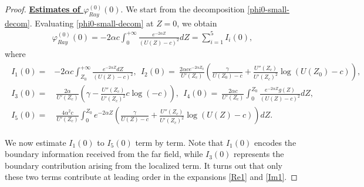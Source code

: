 \documentclass[reqno,11pt]{amsart}
\numberwithin{equation}{section}
\numberwithin{equation}{section}
\theoremstyle{plain}
\begin{document}
\begin{proof}
	\underline{\bf Estimates of $\varphi_{Ray}^{(0)}(0)$}. We start from the decomposition \eqref{phi0-small-decom}. Evaluating \eqref{phi0-small-decom} at $Z=0$, we obtain
	\begin{align}\label{phi0-0}
		\varphi_{Ray}^{(0)}(0)=-2\alpha c\int_{0}^{+\infty}\frac{e^{-2\alpha Z}}{(U(Z)-c)^2}dZ=\sum_{i=1}^{5}I_i(0),
	\end{align}
	where
	\begin{align}\begin{aligned}
			I_1(0)=&-2\alpha c\int_{Z_0}^{+\infty}\frac{e^{-2\alpha Z}dZ}{(U(Z)-c)^2},\ \  I_{2}(0) = ~\frac{2\alpha ce^{-2\alpha Z_0}}{U'(Z_c)}\left(\frac{\gamma}{U(Z_0)-c}+\frac{U''(Z_c)}{U'(Z_c)^2}\log(U(Z_0)-c)\right), \\
			I_{3}(0) =& ~\frac{2\alpha}{U'(Z_c)}\left(\gamma-\frac{U''(Z_c)}{U'(Z_c)^2}c\log(-c)\right), \ \
			I_{4}(0) =   ~\frac{2\alpha c}{U'(Z_c)}\int_{0}^{Z_0}\frac{e^{-2\alpha Z}g(Z)}{(U(Z)-c)^2}dZ,\\
			I_{5}(0) =&   ~\frac{4\alpha^2 c}{U'(Z_c)}\int_{0}^{Z_0}e^{-2\alpha Z}\left(\frac{\gamma}{U(Z)-c}+\frac{ U''(Z_c)}{U'(Z_c)^2}\log(U(Z)-c)\right)dZ.\nonumber
	\end{aligned}\end{align}

	We now estimate $I_1(0)$ to $I_5(0)$ term by term. Note that $I_1(0)$ encodes the boundary information received from the far field, while $I_3(0)$ represents the boundary contribution arising from the localized term. It turns out that only these two terms contribute at leading order in the expansions \eqref{Re1} and \eqref{Im1}.
	

\end{proof}
\end{document}
